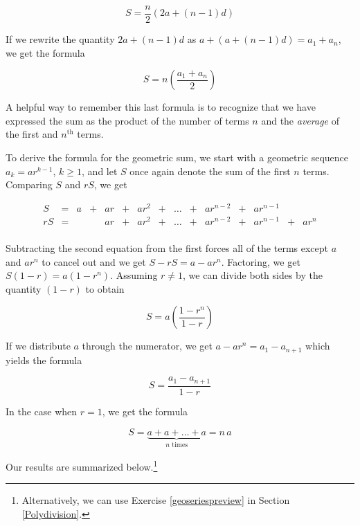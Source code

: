 \documentclass{ximera}
\begin{document}
\[S =  \frac{n}{2} (2a + (n-1)d)\]

If we rewrite the quantity $2a + (n-1)d$ as $a + (a + (n-1)d) = a_{1} + a_{n}$, we get the formula 

\[ S = n \left(\frac{a_{1} + a_{n}}{2}\right)\]

A helpful way to remember this last formula is to recognize that we have expressed the sum as the product of the number of terms $n$ and the \textit{average} of the first and $n^{\text{th}}$ terms.

 

To derive the formula for the geometric sum, we start with a geometric sequence $a_{k} = ar^{k-1}$, $k \geq 1$, and let $S$ once again denote the sum of the first $n$ terms.  Comparing  $S$ and $rS$, we get

\[ \begin{array}{ccccccccccccccc}

S & = & a & + & ar &  + & ar^2 & + & \ldots & + & ar^{n-2} & + & ar^{n-1} & & \\ 

r S & = & & & ar & + & ar^2 & + & \ldots &  + & ar^{n-2} & + & ar^{n-1} & + & ar^{n}  \\

\end{array}\]

Subtracting the second equation from the first forces all of the terms except $a$ and $ar^{n}$ to cancel out and we get $S - rS = a - ar^{n}$.  Factoring, we get $S(1-r) = a \left(1-r^{n}\right)$.  Assuming $r \neq 1$, we can divide both sides by  the quantity $(1-r)$ to obtain

\[S =  a \left( \frac{1-r^n}{1-r}\right)\]

If we distribute $a$ through the numerator, we get $a - ar^{n} = a_{1} - a_{n+1}$ which yields the formula

\[S =  \frac{a_{1}-a_{n+1}}{1-r}\]

In the case when $r=1$, we get the formula

\[ S = \underbrace{a + a + \ldots +a }_{\text{$n$ times}} = n \, a\]

Our results are summarized below.\footnote{Alternatively, we can use Exercise \ref{geoseriespreview} in Section \ref{Polydivision}.}


 

\end{document}
